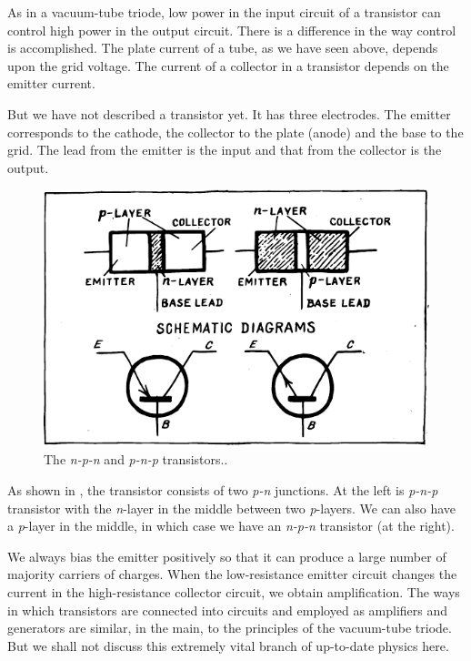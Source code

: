 As in a vacuum-tube triode, low power in the input circuit of a transistor can control high power in the output circuit. There is a difference in the way control is accomplished. The plate current of a tube, as we have seen above, depends upon the grid voltage. The current of a collector in a transistor depends on the emitter current.

But we have not described a transistor yet. It has three electrodes. The emitter corresponds to the cathode, the collector to the plate (anode) and the base to the grid. The lead from the emitter is the input and that from the collector is the output.

\begin{figure}[!ht]
\centering
\includegraphics[width=\textwidth]{figures/fig-06-08.pdf}
\caption{The \emph{n-p-n} and \emph{p-n-p} transistors..}
\label{fig-6.8}
\end{figure}

As shown in , the transistor consists of two \emph{p-n} junctions. At the left is \emph{p-n-p} transistor with the \emph{n}-layer in the middle between two \emph{p}-layers. We can also have a \emph{p}-layer in the middle, in which case we have an \emph{n-p-n} transistor (at the right).

We always bias the emitter positively so that it can produce a large number of majority carriers of charges. When the low-resistance emitter circuit changes the current in the high-resistance collector circuit, we obtain amplification.
The ways in which transistors are connected into circuits and employed as amplifiers and generators are similar, in the main, to the principles of the vacuum-tube triode. But we shall not discuss this extremely vital branch of up-to-date physics here.


